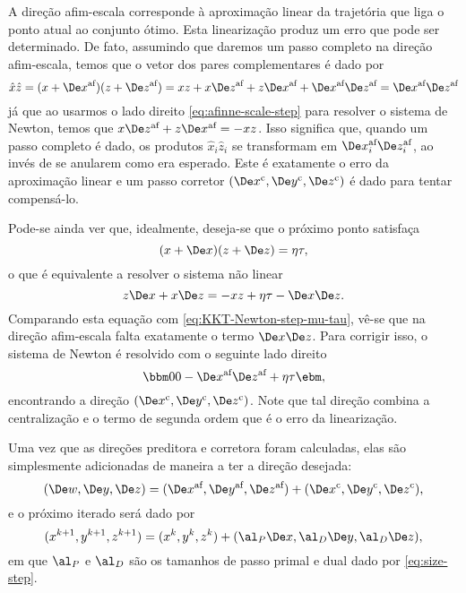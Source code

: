 A direção afim-escala corresponde à aproximação linear da trajetória que liga o
ponto atual ao conjunto ótimo.  Esta linearização produz um erro que pode ser
determinado. De fato, assumindo que daremos um passo completo na direção
afim-escala, temos que o vetor dos pares complementares é  dado por \[
\hat{x}\hat{z} = (x+\dex)(z + \dez) = xz + x\dez + z\dex + \dex
\dez =  \dex\dez \] já que ao usarmos o lado direito
\eqref{eq:afinne-scale-step} para resolver o sistema de Newton, temos que
$x\dez  + z\dex  = -xz$. Isso significa que, quando um passo completo é
dado, os produtos $\hat{x}_i\hat{z}_i$ se transformam em $\dex_i\dez_i $, ao
invés de se anularem como era esperado. Este é exatamente o erro da aproximação linear e
um passo corretor $(\Decox, \Decoy, \Decoz)$ é dado para tentar compensá-lo.

Pode-se ainda ver que, idealmente, deseja-se que o próximo ponto 
satisfaça  \[ (x+\Dex)(z+\Dez) =\eta\tau , \] o que é equivalente a resolver
o sistema não linear \[ z\Dex + x\Dez = -xz + \eta\tau 
 - \Dex\Dez . \] Comparando esta equação com
 \eqref{eq:KKT-Newton-step-mu-tau}, vê-se que na direção afim-escala falta
 exatamente o termo $\Dex\Dez$. Para corrigir isso, o sistema de Newton é
 resolvido com o seguinte lado direito
  \begin{equation}
 \label{eq:corrector-centralizer-step}
 \bbm 0\\ 0 \\ - \dex \dez  + \eta\tau  \ebm, 
 \end{equation}
 encontrando a direção $(\Decox, \Decoy, \Decoz)$. Note que tal direção
 combina a centralização e o termo de segunda ordem   que é o 
 erro da linearização.
 
 Uma vez que as direções preditora e corretora foram calculadas, elas são
 simplesmente adicionadas de maneira a ter a direção desejada:
\begin{equation}
\label{eq:Mehrotra-direction}
 (\Dew, \Dey, \Dez) =  (\dex, \dey, \dez) +  (\Decox, \Decoy,
 \Decoz),
\end{equation}
 e o próximo iterado será dado por
\begin{equation}
\label{eq:Mehrotra-updating}
 (x^{k+1}, y^{k+1},  z^{k+1}) =  (x^{k}, y^{k},  z^{k}) + (\al_P\Dex,\al_D \De
 y, \al_D\Dez),
\end{equation}
 em que $\al_P$ e $\al_D$ são os tamanhos de passo primal e dual dado por
 \eqref{eq:size-step}. 
 
